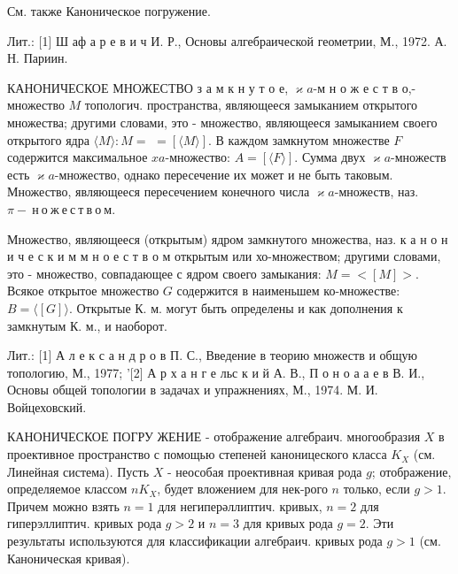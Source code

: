 \documentclass[10pt]{article}
\begin{document}
См. также Каноническое погружение.



Лит.: [1] Ш аф а р е в и ч И. Р., Основы алгебраической геометрии, М., 1972. А. Н. Париин.



КАНОНИЧЕСКОЕ МНОЖЕСТВО з а м к н у т о е, $\varkappa a$-м н о ж е с т в о,- множество $M$ топологич. пространства, являющееся замыканием открытого множества; другими словами, это - множество, являющееся замыканием своего открытого ядра $\langle M\rangle: M=$ $=[\langle M\rangle]$. В каждом замкнутом множестве $F$ содержится максимальное $x a$-множество: $A=[\langle F\rangle]$. Сумма двух $\varkappa a$-множеств есть $\varkappa a$-множество, однако пересечение их может и не быть таковым. Множество, являющееся пересечением конечного числа $\varkappa a$-множеств, наз. $\pi-\mathbf{~ н ~ о ~ ж ~ е ~ с ~ т ~ в ~ о ~ м . ~}$



Множество, являющееся (открытым) ядром замкнутого множества, наз. к а н о н и ч е с к и м м н о е с т в о м открытым или хо-множеством; другими словами, это - множество, совпадающее с ядром своего замыкания: $M=<[M]>$. Всякое открытое множество $G$ содержится в наименьшем ко-множестве: $B=\langle[G]\rangle$. Открытые К. м. могут быть определены и как дополнения к замкнутым К. м., и наоборот.



Лит.: [1] А л е к с а н д р о в П. С., Введение в теорию множеств и общую топологию, М., 1977; '[2] А р х а н г е льс к и й А. В., П о н о а а е в В. И., Основы общей топологии в задачах и упражнениях, М., 1974. М. И. Войцеховский.



КАНОНИЧЕСКОЕ ПОГРУ ЖЕНИЕ - отображение алгебраич. многообразия $X$ в проективное пространство с помощью степеней каноницеского класса $K_{X}$ (см. Линейная система). Пусть $X$ - неособая проективная кривая рода $g$; отображение, определяемое классом $n K_{X}$, будет вложением для нек-рого $n$ только, если $g>1$. Причем можно взять $n=1$ для негиперәллиптич. кривых, $n=2$ для гиперэллиптич. кривых рода $g>2$ и $n=3$ для кривых рода $g=2$. Эти результаты используются для классификации алгебраич. кривых рода $g>1$ (см. Каноническая кривая).
\end{document}
